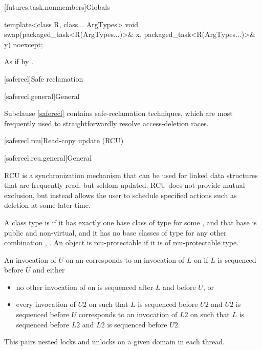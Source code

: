 [futures.task.nonmembers]{Globals}

%
\begin{itemdecl}
template<class R, class... ArgTypes>
  void swap(packaged_task<R(ArgTypes...)>& x, packaged_task<R(ArgTypes...)>& y) noexcept;
\end{itemdecl}

\begin{itemdescr}
\pnum
\effects
As if by .
\end{itemdescr}

[saferecl]{Safe reclamation}

[saferecl.general]{General}

\pnum
Subclause \ref{saferecl} contains safe-reclamation techniques, which are most
frequently used to straightforwardly resolve access-deletion races.

[saferecl.rcu]{Read-copy update (RCU)}

[saferecl.rcu.general]{General}

\pnum
RCU is a synchronization mechanism
that can be used for linked data structures
that are frequently read, but seldom updated.
RCU does not provide mutual exclusion,
but instead allows the user to schedule specified actions
such as deletion at some later time.

\pnum
A class type  is 
if it has exactly one base class of type 
for some , and that base is public and non-virtual, and
it has no base classes of type 
for any other combination , .
An object is rcu-protectable if it is of rcu-protectable type.

\pnum
An invocation of  $U$ on an 
corresponds to an invocation of  $L$ on 
if $L$ is sequenced before $U$ and either
\begin{itemize}
\item
no other invocation of  on 
is sequenced after $L$ and before $U$, or
\item
every invocation of  $U2$ on 
such that $L$ is sequenced before $U2$ and $U2$ is sequenced before $U$
corresponds to an invocation of  $L2$ on 
such that $L$ is sequenced before $L2$ and $L2$ is sequenced before $U2$.
\end{itemize}
\begin{note}
This pairs nested locks and unlocks on a given domain in each thread.
\end{note}

